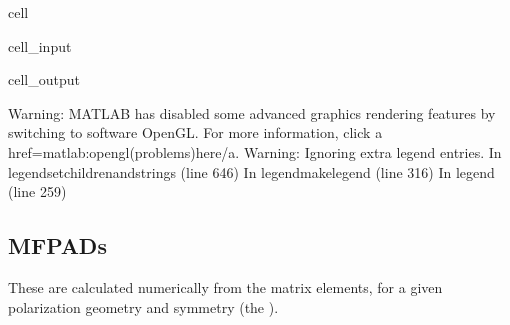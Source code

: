 \documentclass[letterpaper,10pt,english]{jupyterBook}
\begin{document}
\begin{sphinxuseclass}{cell}
\begin{sphinxVerbatimInput}
\begin{sphinxuseclass}{cell_input}
\end{sphinxuseclass}\end{sphinxVerbatimInput}
\begin{sphinxVerbatimOutput}

\begin{sphinxuseclass}{cell_output}
\begin{sphinxVerbatim}[commandchars=\\\{\}]
Warning: MATLAB has disabled some advanced graphics rendering features by switching to software OpenGL. For more information, click \PYGZlt{}a href=\PYGZdq{}matlab:opengl(\PYGZsq{}problems\PYGZsq{})\PYGZdq{}\PYGZgt{}here\PYGZlt{}/a\PYGZgt{}.
Warning: Ignoring extra legend entries.
\PYGZgt{} In legend\PYGZgt{}set\PYGZus{}children\PYGZus{}and\PYGZus{}strings (line 646)
  In legend\PYGZgt{}make\PYGZus{}legend (line 316)
  In legend (line 259)
\end{sphinxVerbatim}

\noindent{}

\end{sphinxuseclass}\end{sphinxVerbatimOutput}

\end{sphinxuseclass}

\subsection{MFPADs}
\label{\detokenize{testChpt/ePSproc_Matlab_demo_notebook_090821:mfpads}}
\sphinxAtStartPar
These are calculated numerically from the matrix elements, for a given polarization geometry and symmetry (the ).
\end{document}
